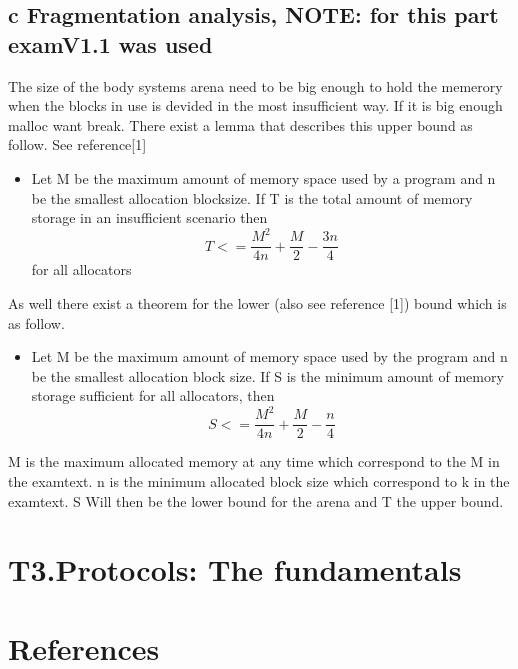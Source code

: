 \documentclass[a4paper,12pt,danish]{report}
\begin{document}
\subsection{c Fragmentation analysis, NOTE: for this part examV1.1 was used}

The size of the body systems arena need to be big enough to hold the memerory
when the blocks in use is devided in the most insufficient way. If it is big
enough malloc want break. There exist a lemma that describes this upper bound as
follow. See reference[1]
\begin{itemize}
  \item Let M be the maximum amount of memory space used by a program and n be
  the smallest allocation blocksize. If T is the total amount of memory storage
  in an insufficient scenario then 
  $$T<=\frac{M^{2}}{4n} + \frac{M}2 - \frac{3n} 4$$
  for all allocators
\end{itemize}
As well there exist a theorem for the lower (also see reference [1]) bound
which is as follow.

\begin{itemize}
  \item 
Let M be the maximum amount of memory space
used by the program and n be the smallest allocation block size.
If S is the minimum amount of memory storage sufficient for
all allocators, then
  $$S<=\frac{M^{2}}{4n} + \frac{M}2 - \frac{n} 4$$
\end{itemize}

M is the maximum allocated memory at any time which correspond to the M in the
examtext. n is the minimum allocated block size which correspond to k in the
examtext. S Will then be the lower bound for the arena and T the upper
bound.

\newpage
\section{T3.Protocols: The fundamentals}

\subsection{}


\newpage
\section{References}
\subsection{}
\end{document}
